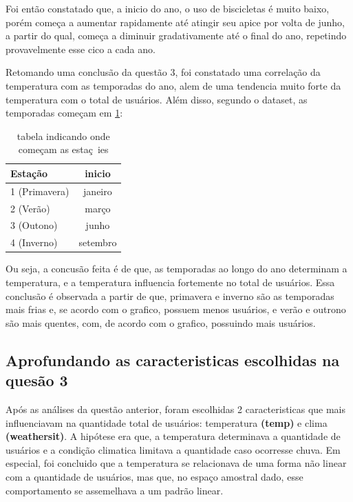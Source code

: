 \documentclass[12pt,a4paper]{article}
\begin{document}
Foi então constatado que,  a inicio do ano, o uso de biscicletas é muito baixo, porém começa a aumentar rapidamente até atingir seu apice 
por volta de junho, a partir do qual, começa a diminuir gradativamente até o final do ano, repetindo provavelmente esse
cico a cada ano. 

Retomando uma conclusão da questão 3, foi constatado uma correlação da temperatura com as temporadas do ano, alem de uma
tendencia muito forte da temperatura com o total de usuários. Além disso, segundo o dataset, as temporadas começam em \ref{tab:iniciotemp}:

\begin{table}[H]
    \centering
    \caption{tabela indicando onde começam as estaç~ies}
    \label{tab:iniciotemp}
    \begin{tabular}{lc}
        \toprule
        \textbf{Estação} & inicio\\
        \midrule
        1 (Primavera) & janeiro \\
        2 (Verão)     &  março   \\
        3 (Outono)    &  junho  \\
        4 (Inverno)   & setembro \\
        \bottomrule
    \end{tabular}
    \vspace{2mm}
\end{table}

Ou seja, a concusão feita é de que, as temporadas ao longo do ano determinam a temperatura, e a temperatura influencia fortemente 
no total de usuários. Essa conclusão é observada a partir de que, primavera e inverno são as  temporadas mais frias
e, se acordo com o grafico, possuem menos usuários, e verão e outrono são mais quentes, com, de acordo com o grafico, possuindo mais usuários.

\subsection{Aprofundando as caracteristicas escolhidas na quesão 3}

Após as análises da questão anterior, foram escolhidas 2 caracteristicas que mais influenciavam na quantidade total de usuários: 
temperatura \textbf{(temp)} e clima \textbf{(weathersit)}. A hipótese era que, a temperatura determinava a quantidade de usuários
e a condição climatica limitava a quantidade caso ocorresse chuva. Em especial, foi concluido que a temperatura
se relacionava de uma forma não linear com a quantidade de usuários, mas que, no espaço amostral dado, esse comportamento
se assemelhava a um padrão linear.
\end{document}
